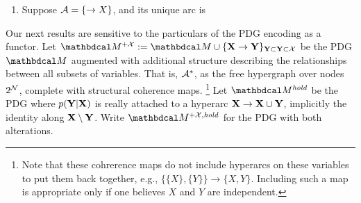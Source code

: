 
\begin{example}
\begin{enumerate}
    \item  Suppose $\mathcal A = \{ \to X\}$, and its unique arc is 
\end{enumerate}    
\end{example}


Our next results are sensitive to the particulars of the PDG encoding as a functor. Let $\dg M^{+\X} := \dg M \cup \{ \mat X \to \mat Y \}_{\mat Y \subset \mat Y \subset \X}$
be the PDG $\dg M$ augmented with additional structure describing the relationships between all subsets of variables. That is, $\mathcal A^*$, as the free hypergraph over nodes $2^\mathcal N$, complete with structural coherence maps.
\unskip\footnote{
Note that these cohrerence maps do not include hyperarcs on these variables to put them back together, e.g., $\{ \{X\}, \{Y\}\} \to \{X,Y\}$.
Including such a map is appropriate only if one believes $X$ and $Y$ are independent.
}
Let $\dg M^{\mathit{hold}}$ be the PDG where $p(\mathbf Y|\mathbf X)$ is really attached to a hyperarc $\mathbf X \to \mathbf X \cup \mathbf Y$, implicitly the identity along $\mathbf X \setminus \mathbf Y$. 
Write $\dg M^{+\X,\mathit{hold}}$ for the PDG with both alterations.

